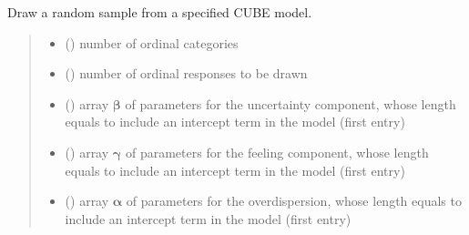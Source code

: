 \documentclass[letterpaper,10pt,english]{sphinxmanual}
\begin{document}

\begin{fulllineitems}
\label{\detokenize{cubmods:cubmods.cube_ywz.draw}}
\pysigstartsignatures
{}
\pysigstopsignatures
\sphinxAtStartPar
Draw a random sample from a specified CUBE model.
\begin{quote}\begin{description}
\begin{itemize}
\item {} 
\sphinxAtStartPar
{} () \textendash{} number of ordinal categories

\item {} 
\sphinxAtStartPar
{} () \textendash{} number of ordinal responses to be drawn

\item {} 
\sphinxAtStartPar
{} () \textendash{} array \(\pmb \beta\) of parameters for the uncertainty component, whose length equals 
 to include an intercept term in the model (first entry)

\item {} 
\sphinxAtStartPar
{} () \textendash{} array \(\pmb \gamma\) of parameters for the feeling component, whose length equals 
 to include an intercept term in the model (first entry)

\item {} 
\sphinxAtStartPar
{} () \textendash{} array \(\pmb \alpha\) of parameters for the overdispersion, whose length equals 
 to include an intercept term in the model (first entry)


\end{itemize}
\end{description}
\end{quote}
\end{fulllineitems}
\end{document}
